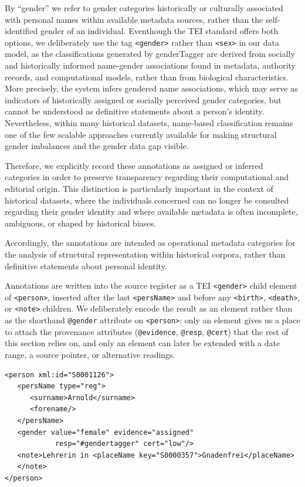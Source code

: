 \documentclass{eceasst}
\begin{document}

By “gender” we refer to gender categories historically or culturally associated with personal names within available metadata sources, rather than the self-identified gender of an individual. Eventhough the TEI standard offers both options, we deliberately use the tag \texttt{<gender>} rather than \texttt{<sex>} in our data model, as the classifications generated by genderTagger are derived from socially and historically informed name-gender associations \cite{buskirk_open-source_2023} found in metadata, authority records, and computational models, rather than from biological characteristics. More precisely, the system infers gendered name associations, which may serve as indicators of historically assigned or socially perceived gender categories, but cannot be understood as definitive statements about a person’s identity. Nevertheless, within many historical datasets, name-based classification remains one of the few scalable approaches currently available for making structural gender imbalances and the gender data gap visible.

Therefore, we explicitly record these annotations as assigned or inferred categories in order to preserve transparency regarding their computational and editorial origin. This distinction is particularly important in the context of historical datasets, where the individuals concerned can no longer be consulted regarding their gender identity and where available metadata is often incomplete, ambiguous, or shaped by historical biases. 

Accordingly, the annotations are intended as operational metadata categories for the analysis of structural representation within historical corpora, rather than definitive statements about personal identity.

Annotations are written into the source register as a TEI \texttt{<gender>} child element of \texttt{<person>}, inserted after the last \texttt{<persName>} and before any \texttt{<birth>}, \texttt{<death>}, or \texttt{<note>} children. We deliberately encode the result as an element rather than as the shorthand \texttt{@gender} attribute on \texttt{<person>}: only an element gives us a place to attach the provenance attributes (\texttt{@evidence}, \texttt{@resp}, \texttt{@cert}) that the rest of this section relies on, and only an element can later be extended with a date range, a source pointer, or alternative readings.

\begin{verbatim}
<person xml:id="S0001126">
   <persName type="reg">
      <surname>Arnold</surname>
      <forename/>
   </persName>
   <gender value="female" evidence="assigned"
            resp="#gendertagger" cert="low"/>
   <note>Lehrerin in <placeName key="S0000357">Gnadenfrei</placeName>
   </note>
</person>
\end{verbatim}
\end{document}

